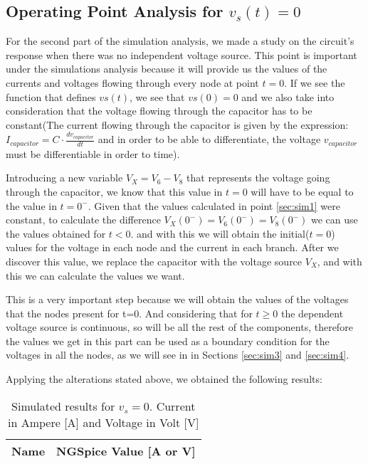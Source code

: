 \subsection{Operating Point Analysis for $v_s(t)=0$}
For the second part of the simulation analysis, we made a study on the circuit's response when there was no independent voltage source. This point is important under the simulations analysis because it will provide us the values of the currents and voltages flowing through every node at point $t=0$. If we see the function that defines $vs(t)$, we see that $vs(0)=0$ and we also take into consideration that the voltage flowing through the capacitor has to be constant(The current flowing through the capacitor is given by the expression: $I_{capacitor}=C\cdot\frac{dv_{capacitor}}{dt}$ and in order to be able to differentiate, the voltage $v_{capacitor}$ must be differentiable in order to time).\par Introducing a new variable $V_X=V_6-V_8$ that represents the voltage going through the capacitor, we know that this value in $t=0$ will have to be equal to the value in $t=0^{-}$. Given that the values calculated in point \ref{sec:sim1} were constant, to calculate the difference $V_X(0^{-})=V_6(0^{-})=V_8(0^{-})$ we can use the values obtained for $t<0$. and with this we will obtain the initial($t=0$) values for the voltage in each node and the current in each branch. After we discover this value, we replace the capacitor with the voltage source $V_X$, and with this we can calculate the values we want. \par
This is a very important step because we will obtain the values of the voltages that the nodes present for t=0. And considering that for $t\geq0$ the dependent voltage source is continuous, so will be all the rest of the components, therefore the values we get in this part can be used as a boundary condition for the voltages in all the nodes, as we will see in in Sections  \ref{sec:sim3} and \ref{sec:sim4}.\par
Applying the alterations stated above, we obtained the following results:

\FloatBarrier
\begin{table}[h]
	\centering
	\begin{tabular}{|l|r|}
		\hline    
		{\bf Name} & {\bf NGSpice Value [A or V]} \\ \hline
				
	\end{tabular}
	\caption{Simulated results for $v_s=0$. Current in Ampere [A] and Voltage in Volt [V]}
	\label{tab:ngspice2}
\end{table}
\FloatBarrier

